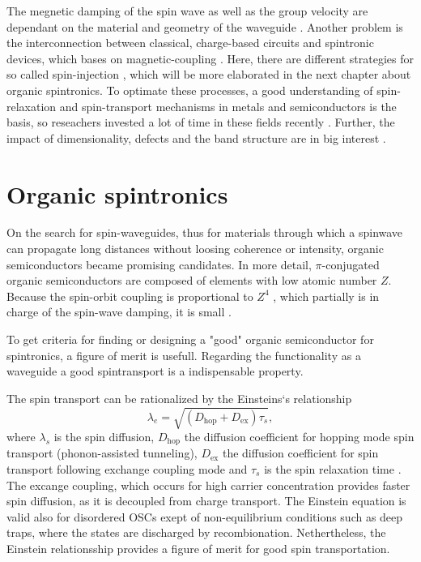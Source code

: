 The megnetic damping of the spin wave as well as the group velocity are dependant on the material and geometry of the waveguide \cite{computing} \cite{SC-spintronics}.
Another problem is the interconnection between classical, charge-based circuits and spintronic devices, which bases on magnetic-coupling \cite{clocks}. 
Here, there are different strategies for so called spin-injection \cite{perovskite}, which will be more elaborated in the next chapter about organic spintronics.
To optimate these processes, a good understanding of spin-relaxation and spin-transport mechanisms in metals and semiconductors is the basis, so reseachers invested a lot of time in these fields recently \cite{perovskite}.
Further, the impact of dimensionality, defects and the band structure are in big interest \cite{perovskite} \cite{SC-spintronics}.


\section{Organic spintronics}
\label{sec:org-spintronics}
On the search for spin-waveguides, thus for materials through which a spinwave can propagate long distances without loosing coherence or intensity, organic semiconductors became promising candidates.
In more detail, $\pi$-conjugated organic semiconductors are composed of elements with low atomic number $Z$.
Because the spin-orbit coupling is proportional to $Z^4$ \cite{routes}, which partially is in charge of the spin-wave damping, it is small \cite{appl-organic}.

To get criteria for finding or designing a "good" organic semiconductor for spintronics, a figure of merit is usefull.
Regarding the functionality as a waveguide a good spintransport is a indispensable property.

The spin transport can be rationalized by the Einsteins`s relationship 
\begin{equation}
    \lambda_e = \sqrt{(D_\text{hop} + D_\text{ex})\tau_s},
\end{equation}
where $\lambda_s$ is the spin diffusion, $D_\text{hop}$ the diffusion coefficient for hopping mode spin transport (phonon-assisted tunneling), $D_\text{ex}$ the diffusion coefficient for spin transport following exchange coupling mode and $\tau_s$ is the spin relaxation time \cite{perovskite}.
The excange coupling, which occurs for high carrier concentration provides faster spin diffusion, as it is decoupled from charge transport.
The Einstein equation is valid also for disordered OSCs exept of non-equilibrium conditions such as deep traps, where the states are discharged by recombionation.
Nethertheless, the Einstein relationsship provides a figure of merit for good spin transportation.


